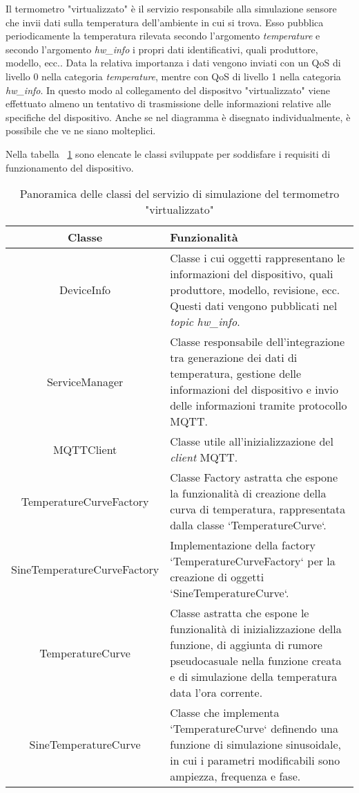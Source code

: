 
Il termometro "virtualizzato" è il servizio responsabile alla simulazione sensore che invii dati sulla temperatura dell'ambiente in cui si trova.
Esso pubblica periodicamente la temperatura rilevata secondo l'argomento \emph{temperature} e secondo l'argomento \emph{hw\_info} i propri dati identificativi, quali produttore, modello, ecc..
Data la relativa importanza i dati vengono inviati con un QoS di livello 0 nella categoria \emph{temperature}, mentre con QoS di livello 1 nella categoria \emph{hw\_info}.
In questo modo al collegamento del dispositvo "virtualizzato" viene effettuato almeno un tentativo di trasmissione delle informazioni relative alle specifiche del dispositivo.
Anche se nel diagramma è disegnato individualmente, è possibile che ve ne siano molteplici.

Nella tabella ~\ref{tab:classi-termometro} sono elencate le classi sviluppate per soddisfare i requisiti di funzionamento del dispositivo.

\begin{table}[H]
\caption{Panoramica delle classi del servizio di simulazione del termometro "virtualizzato"}
\label{tab:classi-termometro}
\begin{tabularx}{\linewidth}{|c|X|}
\hline
\textbf{Classe} & \textbf{Funzionalità} \\
\hline
DeviceInfo & Classe i cui oggetti rappresentano le informazioni del dispositivo, quali produttore, modello, revisione, ecc. Questi dati vengono pubblicati nel \emph{topic} \emph{hw\_info}. \\
\hline
ServiceManager & Classe responsabile dell'integrazione tra generazione dei dati di temperatura, gestione delle informazioni del dispositivo e invio delle informazioni tramite protocollo MQTT. \\
\hline
MQTTClient & Classe utile all'inizializzazione del \emph{client} MQTT. \\
\hline
TemperatureCurveFactory & Classe Factory astratta che espone la funzionalità di creazione della curva di temperatura, rappresentata dalla classe `TemperatureCurve`. \\
\hline
SineTemperatureCurveFactory & Implementazione della factory `TemperatureCurveFactory` per la creazione di oggetti `SineTemperatureCurve`. \\
\hline
TemperatureCurve & Classe astratta che espone le funzionalità di inizializzazione della funzione, di aggiunta di rumore pseudocasuale nella funzione creata e di simulazione della temperatura data l'ora corrente. \\
\hline
SineTemperatureCurve & Classe che implementa `TemperatureCurve` definendo una funzione di simulazione sinusoidale, in cui i parametri modificabili sono ampiezza, frequenza e fase. \\
\hline
\end{tabularx}
\end{table}

